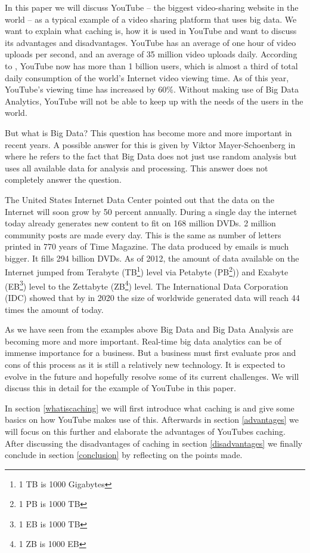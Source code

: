 In this paper we will discuss YouTube -- the biggest video-sharing website in the world -- as a typical example of a video sharing platform that uses big data. We want to explain what caching is, how it is used in YouTube and want to discuss its advantages and disadvantages. YouTube has an average of one hour of video uploads per second, and an average of 35 million video uploads daily. According to \cite{expandedramblings:stats}, YouTube now has more than 1 billion users, which is almost a third of total daily consumption of the world's Internet video viewing time. As of this year, YouTube's viewing time has increased by 60\%. Without making use of Big Data Analytics, YouTube will not be able to keep up with the needs of the users in the world. 

But what is Big Data? This question has become more and more important in recent years. A possible answer for this is given by Viktor Mayer-Schoenberg in \cite{Mayer-Schnberger:2013:BDR:2588165} where he refers to the fact that Big Data does not just use random analysis but uses all available data for analysis and processing. This answer does not completely answer the question. 

The United States Internet Data Center pointed out that the data on the Internet will soon grow by 50 percent annually. During a single day the internet today already generates new content to fit on 168 million DVDs. 2 million community posts are made every day. This is the same as number of letters printed in 770 years of Time Magazine. The data produced by emails is much bigger. It fills 294 billion DVDs. As of 2012, the amount of data available on the Internet jumped from Terabyte (TB\footnote{1 TB is 1000 Gigabytes}) level via Petabyte (PB\footnote{1 PB is 1000 TB})) and Exabyte (EB\footnote{1 EB is 1000 TB}) level to the Zettabyte (ZB\footnote{1 ZB is 1000 EB}) level. The International Data Corporation (IDC) showed that by in 2020 the size of worldwide generated data will reach 44 times the amount of today. 

As we have seen from the examples above Big Data and Big Data Analysis are becoming more and more important. Real-time big data analytics can be of immense importance for a business. But a business must first evaluate pros and cons of this process as it is still a relatively new technology. It is expected to evolve in the future and hopefully resolve some of its current challenges. We will discuss this in detail for the example of YouTube in this paper. 

In section \ref{whatiscaching} we will first introduce what caching is and give some basics on how YouTube makes use of this. Afterwards in section \ref{advantages} we will focus on this further and elaborate the advantages of YouTubes caching. After discussing the disadvantages of caching in section \ref{disadvantages} we finally conclude in section \ref{conclusion} by reflecting on the points made. 
